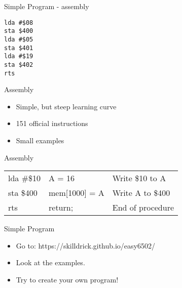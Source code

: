 \documentclass[aspectratio=43]{uva-inf-presentation}
\begin{document}

\begin{frame}[fragile]{Simple Program - assembly}

\begin{lstlisting}
lda #$08
sta $400
lda #$05
sta $401
lda #$19
sta $402
rts
\end{lstlisting}

\end{frame}


\begin{frame}{Assembly}

\begin{itemize}
\item Simple, but steep learning curve
\item 151 official instructions
\item Small examples
\end{itemize}

\end{frame}


\begin{frame}{Assembly}

\begin{tabular}{l|l|l}
lda \#\$10 & A = 16 & Write \$10 to A \\
sta \$400 & mem[1000] = A & Write A to \$400 \\
rts & return; & End of procedure \\
\end{tabular}

\end{frame}


\begin{frame}{Simple Program}

\begin{itemize}
\item Go to: https://skilldrick.github.io/easy6502/
\item Look at the examples.
\item Try to create your own program!
\end{itemize}


\end{frame}

\end{document}

